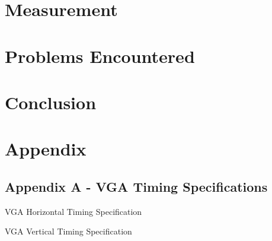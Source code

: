 \documentclass[a4paper,12pt]{article}
\begin{document}
\section{Measurement}
\newpage
\section{Problems Encountered}
\newpage
\section{Conclusion}
\newpage
\section{Appendix}
\subsection{Appendix A - VGA Timing Specifications}
\begin{flushleft}
\begin{table}[H]
	\centering
	\caption{VGA Horizontal Timing Specification \cite{terasic_2014}}
\end{table}
\begin{table}[H]
	\centering
	\caption{VGA Vertical Timing Specification \cite{terasic_2014}}
\end{table}
\end{flushleft}
\newpage
{}
\begin{flushleft}

\end{flushleft}
\end{document}
